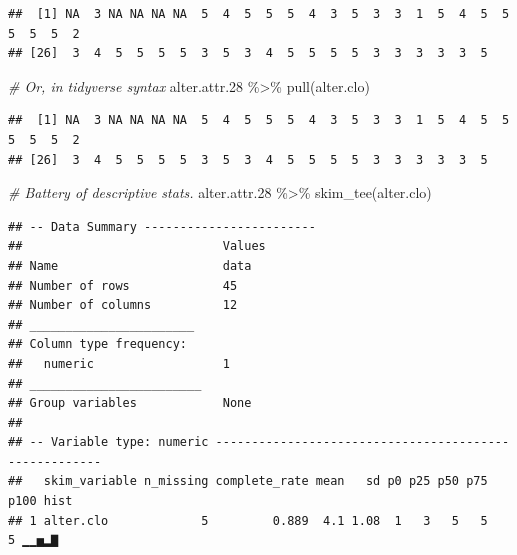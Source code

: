 \documentclass[
]{book}
\newenvironment{Shaded}{\begin{snugshade}}{\end{snugshade}}
\newcommand{\CommentTok}[1]{\textcolor[rgb]{0.56,0.35,0.01}{\textit{#1}}}
\newcommand{\FloatTok}[1]{\textcolor[rgb]{0.00,0.00,0.81}{#1}}
\newcommand{\FunctionTok}[1]{\textcolor[rgb]{0.00,0.00,0.00}{#1}}
\newcommand{\NormalTok}[1]{#1}
\newcommand{\SpecialCharTok}[1]{\textcolor[rgb]{0.00,0.00,0.00}{#1}}
\begin{document}
\begin{Shaded}
\end{Shaded}

\begin{verbatim}
##  [1] NA  3 NA NA NA NA  5  4  5  5  5  4  3  5  3  3  1  5  4  5  5  5  5  5  2
## [26]  3  4  5  5  5  5  3  5  3  4  5  5  5  5  3  3  3  3  3  5
\end{verbatim}

\begin{Shaded}
\begin{Highlighting}[]
\CommentTok{\# Or, in tidyverse syntax}
\NormalTok{alter.attr}\FloatTok{.28} \SpecialCharTok{\%\textgreater{}\%}
  \FunctionTok{pull}\NormalTok{(alter.clo)}
\end{Highlighting}
\end{Shaded}

\begin{verbatim}
##  [1] NA  3 NA NA NA NA  5  4  5  5  5  4  3  5  3  3  1  5  4  5  5  5  5  5  2
## [26]  3  4  5  5  5  5  3  5  3  4  5  5  5  5  3  3  3  3  3  5
\end{verbatim}

\begin{Shaded}
\begin{Highlighting}[]
\CommentTok{\# Battery of descriptive stats.}
\NormalTok{alter.attr}\FloatTok{.28} \SpecialCharTok{\%\textgreater{}\%}
  \FunctionTok{skim\_tee}\NormalTok{(alter.clo) }
\end{Highlighting}
\end{Shaded}

\begin{verbatim}
## -- Data Summary ------------------------
##                            Values
## Name                       data  
## Number of rows             45    
## Number of columns          12    
## _______________________          
## Column type frequency:           
##   numeric                  1     
## ________________________         
## Group variables            None  
## 
## -- Variable type: numeric ------------------------------------------------------
##   skim_variable n_missing complete_rate mean   sd p0 p25 p50 p75 p100 hist 
## 1 alter.clo             5         0.889  4.1 1.08  1   3   5   5    5 ▁▁▅▂▇
\end{verbatim}
\end{document}
